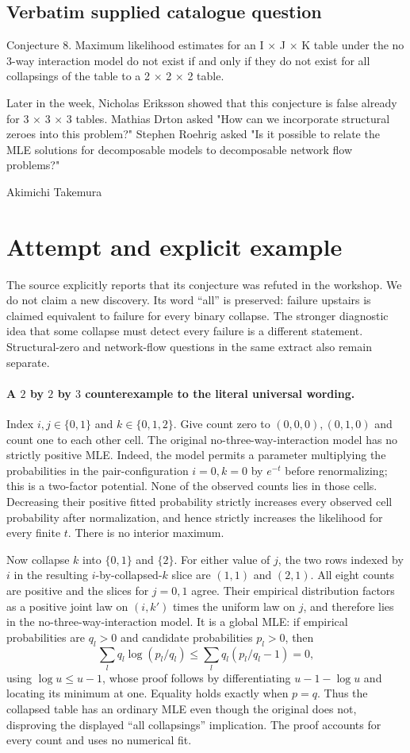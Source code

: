 \documentclass[11pt]{article}
\begin{document}
\subsection{Verbatim supplied catalogue question}
Conjecture 8. Maximum likelihood estimates for an I × J × K table under the no 3-way interaction model do not exist if and only if they do not exist for all collapsings of the table to a 2 × 2 × 2 table.

Later in the week, Nicholas Eriksson showed that this conjecture is false already for 3 × 3 × 3 tables. Mathias Drton asked "How can we incorporate structural zeroes into this problem?" Stephen Roehrig asked "Is it possible to relate the MLE solutions for decomposable models to decomposable network flow problems?"

Akimichi Takemura

\section{Attempt and explicit example}
The source explicitly reports that its conjecture was refuted in the
workshop. We do not claim a new discovery. Its word ``all'' is preserved:
failure upstairs is claimed equivalent to failure for every binary
collapse. The stronger diagnostic idea that some collapse must detect
every failure is a different statement. Structural-zero and network-flow
questions in the same extract also remain separate.

\paragraph{A $2$ by $2$ by $3$ counterexample to the literal universal wording.}
Index $i,j\in\{0,1\}$ and $k\in\{0,1,2\}$. Give count zero to
$(0,0,0),(0,1,0)$ and count one to each other cell. The original
no-three-way-interaction model has no strictly positive MLE.
Indeed, the model permits a parameter multiplying the probabilities in
the pair-configuration $i=0,k=0$ by $e^{-t}$ before renormalizing; this
is a two-factor potential. None of the observed counts lies in those
cells. Decreasing their positive fitted probability strictly increases
every observed cell probability after normalization, and hence strictly
increases the likelihood for every finite $t$. There is no interior maximum.

Now collapse $k$ into $\{0,1\}$ and $\{2\}$. For either value of $j$,
the two rows indexed by $i$ in the resulting $i$-by-collapsed-$k$ slice
are $(1,1)$ and $(2,1)$. All eight counts are positive and the slices
for $j=0,1$ agree. Their empirical distribution factors as a positive
joint law on $(i,k')$ times the uniform law on $j$, and therefore lies
in the no-three-way-interaction model.
It is a global MLE: if empirical probabilities are $q_l>0$ and candidate
probabilities $p_l>0$, then
\[
\sum_lq_l\log(p_l/q_l)\le\sum_lq_l(p_l/q_l-1)=0,
\]
using $\log u\le u-1$, whose proof follows by differentiating
$u-1-\log u$ and locating its minimum at one. Equality holds exactly
when $p=q$. Thus the collapsed table has an ordinary MLE even though
the original does not, disproving the displayed ``all collapsings''
implication. The proof accounts for every count and uses no numerical fit.
\end{document}
